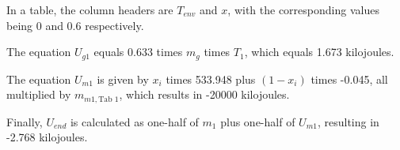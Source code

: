 In a table, the column headers are \( T_{env} \) and \( x \), with the corresponding values being 0 and 0.6 respectively.

The equation \( U_{g1} \) equals 0.633 times \( m_g \) times \( T_1 \), which equals 1.673 kilojoules.

The equation \( U_{m1} \) is given by \( x_i \) times 533.948 plus \( (1 - x_i) \) times -0.045, all multiplied by \( m_{m1, \text{Tab 1}} \), which results in -20000 kilojoules.

Finally, \( U_{end} \) is calculated as one-half of \( m_1 \) plus one-half of \( U_{m1} \), resulting in -2.768 kilojoules.